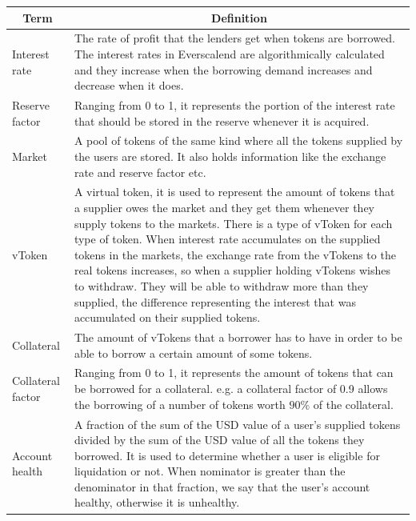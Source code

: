 \begin{tabularx}{\linewidth}{|l|X|}
  \hline
  \multicolumn{1}{|c|}{\textbf{Term}} & \multicolumn{1}{c|}{\textbf{Definition}} \\\hline
  \endhead

  Interest rate & The rate of profit that the lenders get when tokens are borrowed. The interest rates in Everscalend are algorithmically calculated and they increase when the borrowing demand increases and decrease when it does. \\\hline
  
  Reserve factor & Ranging from 0 to 1, it represents the portion of the interest rate that should be stored in the reserve whenever it is acquired. \\\hline
  
  Market & A pool of tokens of the same kind where all the tokens supplied by the users are stored. It also holds information like the exchange rate and reserve factor etc. \\\hline
  
  vToken & A virtual token, it is used to represent the amount of tokens that a supplier owes the market and they get them whenever they supply tokens to the markets. There is a type of vToken for each type of token. When interest rate accumulates on the supplied tokens in the markets, the exchange rate from the vTokens to the real tokens increases, so when a supplier holding vTokens wishes to withdraw. They will be able to withdraw more than they supplied, the difference representing the interest that was accumulated on their supplied tokens. \\\hline
  
  Collateral & The amount of vTokens that a borrower has to have in order to be able to borrow a certain amount of some tokens. \\\hline
  
  Collateral factor & Ranging from 0 to 1, it represents the amount of tokens that can be borrowed for a collateral. e.g. a collateral factor of 0.9 allows the borrowing of a number of tokens worth $90\%$ of the collateral. \\\hline
  
  Account health & A fraction of the sum of the USD value of a user's supplied tokens divided by the sum of the USD value of all the tokens they borrowed. It is used to determine whether a user is eligible for liquidation or not. When nominator is greater than the denominator in that fraction, we say that the user's account healthy, otherwise it is unhealthy. \\\hline
  

\end{tabularx}
